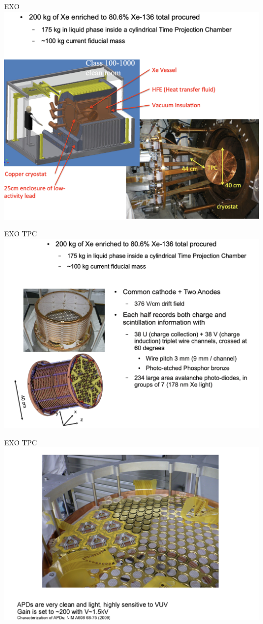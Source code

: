 \documentclass [aspectratio=169]{beamer}
\begin{document}
\begin{frame}{EXO}
\includegraphics[scale=0.40]{exo.png}
\end{frame}

\begin{frame}{EXO TPC}
\includegraphics[scale=0.40]{exo-tpc.png}
\end{frame}

\begin{frame}{EXO TPC}
\includegraphics[scale=0.40]{apds.png}
\end{frame}
\end{document}
